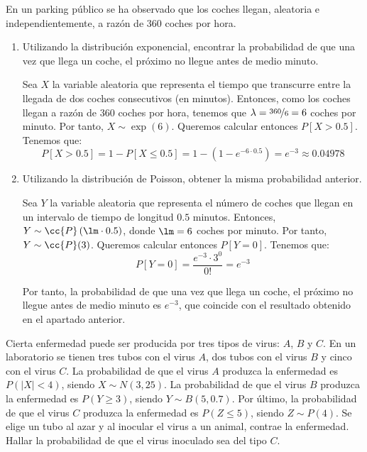 \begin{ejercicio}
    En un parking público se ha observado que los coches llegan, aleatoria e independientemente, a razón de $360$ coches por hora.
    \begin{enumerate}
        \item Utilizando la distribución exponencial, encontrar la probabilidad de que una vez que llega un coche, el próximo no llegue antes de medio minuto.
        
        Sea $X$ la variable aleatoria que representa el tiempo que transcurre entre la llegada de dos coches consecutivos (en minutos). Entonces, como los coches llegan a razón de $360$ coches por hora, tenemos que $\lambda = \nicefrac{360}{6} = 6$ coches por minuto. Por tanto, $X\sim \exp(6)$.
        Queremos calcular entonces $P[X>0.5]$. Tenemos que:
        \begin{equation*}
            P[X>0.5] = 1-P[X\leq 0.5] = 1-(1-e^{-6\cdot 0.5}) = e^{-3} \approx 0.04978
        \end{equation*}

        \item Utilizando la distribución de Poisson, obtener la misma probabilidad anterior.
        
        Sea $Y$ la variable aleatoria que representa el número de coches que llegan en un intervalo de tiempo de longitud $0.5$ minutos. Entonces, $Y\sim \cc{P}\left(\lm\cdot 0.5\right)$, donde $\lm = 6$ coches por minuto. Por tanto, $Y\sim \cc{P}(3)$.
        Queremos calcular entonces $P[Y=0]$. Tenemos que:
        \begin{equation*}
            P[Y=0] = \dfrac{e^{-3}\cdot 3^0}{0!} = e^{-3}
        \end{equation*}

        Por tanto, la probabilidad de que una vez que llega un coche, el próximo no llegue antes de medio minuto es $e^{-3}$, que coincide con el resultado obtenido en el apartado anterior.
    \end{enumerate}
\end{ejercicio}

\begin{ejercicio}
    Cierta enfermedad puede ser producida por tres tipos de virus: $A$, $B$ y $C$. En un laboratorio se tienen tres tubos con el virus $A$, dos tubos con el virus $B$ y cinco con el virus $C$. La probabilidad de que el virus $A$ produzca la enfermedad es $P(|X| < 4)$, siendo $X \sim N(3,25)$. La probabilidad de que el virus $B$ produzca la enfermedad es $P(Y \geq 3)$, siendo $Y \sim B(5,0.7)$. Por último, la probabilidad de que el virus $C$ produzca la enfermedad es $P(Z \leq 5)$, siendo $Z \sim P(4)$. Se elige un tubo al azar y al inocular el virus a un animal, contrae la enfermedad. Hallar la probabilidad de que el virus inoculado sea del tipo $C$.
\end{ejercicio}

